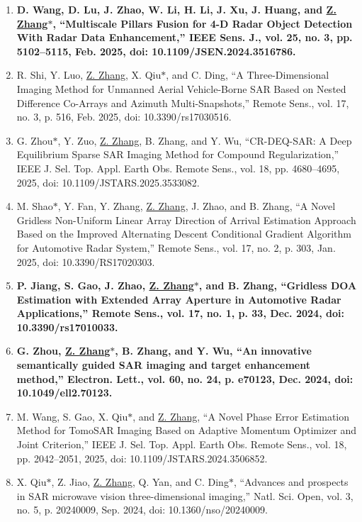 \documentclass[paper=a4,fontsize=11pt]{scrartcl}
\begin{document}
\begin{enumerate}
\item \textbf{D. Wang, D. Lu, J. Zhao, W. Li, H. Li, J. Xu, J. Huang, and \underline{Z. Zhang$\ast$}, ``Multiscale Pillars Fusion for 4-D Radar Object Detection With Radar Data Enhancement,'' IEEE Sens. J., vol. 25, no. 3, pp. 5102–5115, Feb. 2025, doi: 10.1109/JSEN.2024.3516786.}

\item R. Shi, Y. Luo, \underline{Z. Zhang}, X. Qiu$\ast$, and C. Ding, ``A Three-Dimensional Imaging Method for Unmanned Aerial Vehicle-Borne SAR Based on Nested Difference Co-Arrays and Azimuth Multi-Snapshots,'' Remote Sens., vol. 17, no. 3, p. 516, Feb. 2025, doi: 10.3390/rs17030516.

\item G. Zhou$\ast$, Y. Zuo, \underline{Z. Zhang}, B. Zhang, and Y. Wu, ``CR-DEQ-SAR: A Deep Equilibrium Sparse SAR Imaging Method for Compound Regularization,'' IEEE J. Sel. Top. Appl. Earth Obs. Remote Sens., vol. 18, pp. 4680–4695, 2025, doi: 10.1109/JSTARS.2025.3533082.

\item M. Shao$\ast$, Y. Fan, Y. Zhang, \underline{Z. Zhang}, J. Zhao, and B. Zhang, ``A Novel Gridless Non-Uniform Linear Array Direction of Arrival Estimation Approach Based on the Improved Alternating Descent Conditional Gradient Algorithm for Automotive Radar System,'' Remote Sens., vol. 17, no. 2, p. 303, Jan. 2025, doi: 10.3390/RS17020303.

\item \textbf{P. Jiang, S. Gao, J. Zhao, \underline{Z. Zhang$\ast$}, and B. Zhang, ``Gridless DOA Estimation with Extended Array Aperture in Automotive Radar Applications,'' Remote Sens., vol. 17, no. 1, p. 33, Dec. 2024, doi: 10.3390/rs17010033.}

\item \textbf{G. Zhou, \underline{Z. Zhang$\ast$}, B. Zhang, and Y. Wu, ``An innovative semantically guided SAR imaging and target enhancement method,'' Electron. Lett., vol. 60, no. 24, p. e70123, Dec. 2024, doi: 10.1049/ell2.70123.}

\item M. Wang, S. Gao, X. Qiu$\ast$, and \underline{Z. Zhang}, ``A Novel Phase Error Estimation Method for TomoSAR Imaging Based on Adaptive Momentum Optimizer and Joint Criterion,'' IEEE J. Sel. Top. Appl. Earth Obs. Remote Sens., vol. 18, pp. 2042–2051, 2025, doi: 10.1109/JSTARS.2024.3506852.

\item X. Qiu$\ast$, Z. Jiao, \underline{Z. Zhang}, Q. Yan, and C. Ding$\ast$, ``Advances and prospects in SAR microwave vision three-dimensional imaging,'' Natl. Sci. Open, vol. 3, no. 5, p. 20240009, Sep. 2024, doi: 10.1360/nso/20240009.
	

\end{enumerate}
\end{document}
